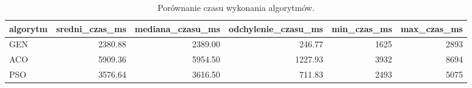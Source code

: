 \begin{table}
\caption{Porównanie czasu wykonania algorytmów.}
\label{tab:czas_wykonania}
\begin{tabular}{lrrrrr}
\toprule
algorytm & sredni_czas_ms & mediana_czasu_ms & odchylenie_czasu_ms & min_czas_ms & max_czas_ms \\
\midrule
GEN & 2380.88 & 2389.00 & 246.77 & 1625 & 2893 \\
ACO & 5909.36 & 5954.50 & 1227.93 & 3932 & 8694 \\
PSO & 3576.64 & 3616.50 & 711.83 & 2493 & 5075 \\
\bottomrule
\end{tabular}
\end{table}
